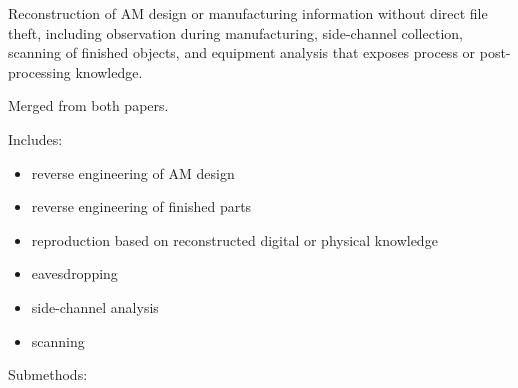 \documentclass[10pt,a4paper,oneside]{report}
\begin{document}
Reconstruction of AM design or manufacturing information without direct file theft, including observation during manufacturing, side-channel collection, scanning of finished objects, and equipment analysis that exposes process or post-processing knowledge.

Merged from both papers.

Includes:

\begin{itemize}
\item reverse engineering of AM design
\item reverse engineering of finished parts
\item reproduction based on reconstructed digital or physical knowledge
\item eavesdropping
\item side-channel analysis
\item scanning
\end{itemize}

Submethods:
\end{document}
